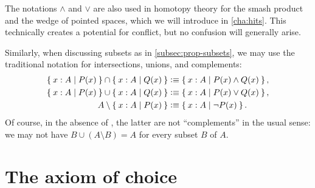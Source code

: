 The notations $\land$ and $\lor$ are also used in homotopy theory for the smash product and the wedge of pointed spaces, which we will introduce in \cref{cha:hits}.
This technically creates a potential for conflict, but no confusion will generally arise.

Similarly, when discussing subsets as in \cref{subsec:prop-subsets}, we may use the traditional notation for intersections, unions, and complements:
%
%
%
%
%
%
\begin{align*}
  \Set{x:A | P(x)} \cap \Set{x:A | Q(x)}
  &\vcentcolon\equiv \Set{x:A | P(x) \land Q(x)},\\
  \Set{x:A | P(x)} \cup \Set{x:A | Q(x)}
  &\vcentcolon\equiv \Set{x:A | P(x) \lor Q(x)},\\
  A \setminus \Set{x:A | P(x)}
  &\vcentcolon\equiv \Set{x:A | \neg P(x)}.
\end{align*}
Of course, in the absence of \LEM{}, the latter are not ``complements'' in the usual sense: we may not have $B \cup (A\setminus B) = A$ for every subset $B$ of $A$.

%
%
%


\section{The axiom of choice}
\label{sec:axiom-choice}


